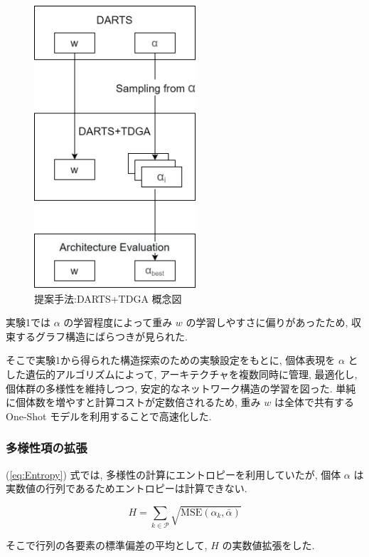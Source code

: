 \begin{figure}[t]
  \begin{center}
    \includegraphics[clip,width=6cm]{./fig/03.pred/datdga.png}
  \end{center}
  \caption{提案手法:DARTS+TDGA 概念図}
  \label{fig:image_ga}
\end{figure}

実験1では $\alpha$ の学習程度によって重み $w$ の学習しやすさに偏りがあったため,
収束するグラフ構造にばらつきが見られた.

そこで実験1から得られた構造探索のための実験設定をもとに,
個体表現を $\alpha$ とした遺伝的アルゴリズムによって,
アーキテクチャを複数同時に管理, 最適化し,
個体群の多様性を維持しつつ, 安定的なネットワーク構造の学習を図った.
単純に個体数を増やすと計算コストが定数倍されるため,
重み $w$ は全体で共有する One-Shot モデルを利用することで高速化した.


\subsubsection{多様性項の拡張}
(\ref{eq:Entropy}) 式では, 多様性の計算にエントロピーを利用していたが,
個体 $\alpha$ は実数値の行列であるためエントロピーは計算できない.

\begin{equation}
H = \sum_{k \in \mathcal{P}} \sqrt{\mathrm{MSE}(\alpha_k, \bar{\alpha})} \label{eq:Entropy-new}
\end{equation}

そこで行列の各要素の標準偏差の平均として, $H$ の実数値拡張をした.


